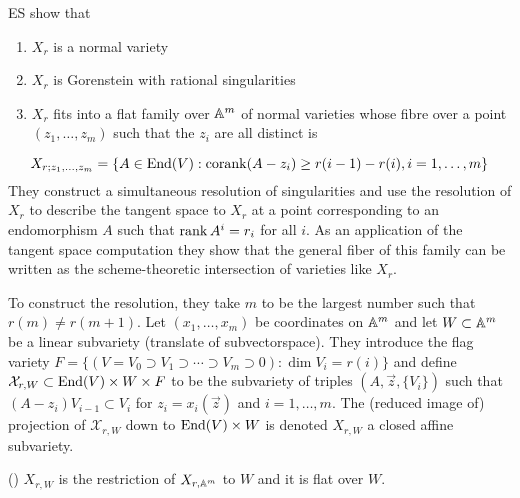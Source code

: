 \documentclass[draft]{article}
\begin{document}
% 
ES show that 
\begin{enumerate}
    \item $X_r$ is a normal variety
    \item $X_r$ is Gorenstein with rational singularities
    \item $X_r$ fits into a flat family over $\AA^m$ of normal varieties whose fibre over a point $(z_1,\dots,z_m)$ such that the $z_i$ are all distinct is 
\end{enumerate}
\[
    X_{r;z_1,\dots,z_m} = \left\{
        A \in \End(V) : \cork(A - z_i) \ge r(i-1) - r(i) , i = 1,\dots,m 
        \right\}
\]
They construct a simultaneous resolution of singularities and use the resolution of $X_r$ to describe the tangent space to $X_r$ at a point corresponding to an endomorphism $A$ such that $\rk A^i = r_i$ for all $i$. As an application of the tangent space computation they show that the general fiber of this family can be written as the scheme-theoretic intersection of varieties like $X_r$. 

To construct the resolution, they take $m$ to be the largest number such that $r(m) \ne r(m+1)$.
Let $(x_1,\dots, x_m)$ be coordinates on $\AA^m$ and let $W\subset \AA^m$ be a linear subvariety (translate of subvectorspace). 
They introduce the flag variety $F = \{(V = V_0 \supset V_1 \supset \cdots \supset V_m \supset 0 ) : \dim V_i = r(i)\}$ and define $\mathcal X_{r,W}\subset\End(V) \times W \times F$ to be the subvariety of triples $(A,\vec z,\{V_i\})$ such that $(A-z_i) V_{i-1} \subset V_i$ for $z_i = x_i(\vec z)$ and $i = 1,\dots,m$. The (reduced image of) projection of $\mathcal X_{r,W}$ down to $\End(V) \times W$ is denoted $X_{r,W}$ a closed affine subvariety. 

\begin{theorem}
    (\cite[Theorem~2.1 iii)]{eisenbud1989rank})
    $X_{r,W}$ is the restriction of $X_{r,\AA^m}$ to $W$ and it is flat over $W$. 
\end{theorem}
\end{document}

